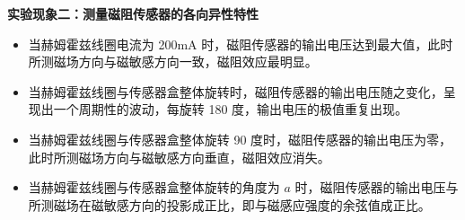 \documentclass[dvipsnames, svgnames,a4paper,11pt]{article}
\begin{document}
\begin{enumerate}
		\textbf{实验现象二：测量磁阻传感器的各向异性特性}
		\begin{itemize}
			\item 当赫姆霍兹线圈电流为 200mA 时，磁阻传感器的输出电压达到最大值，此时所测磁场方向与磁敏感方向一致，磁阻效应最明显。
			\item 当赫姆霍兹线圈与传感器盒整体旋转时，磁阻传感器的输出电压随之变化，呈现出一个周期性的波动，每旋转 180 度，输出电压的极值重复出现。
			\item 当赫姆霍兹线圈与传感器盒整体旋转 90 度时，磁阻传感器的输出电压为零，此时所测磁场方向与磁敏感方向垂直，磁阻效应消失。
			\item 当赫姆霍兹线圈与传感器盒整体旋转的角度为 $a$ 时，磁阻传感器的输出电压与所测磁场在磁敏感方向的投影成正比，即与磁感应强度的余弦值成正比。
		\end{itemize}
		
	\end{enumerate}
	
\end{document}
